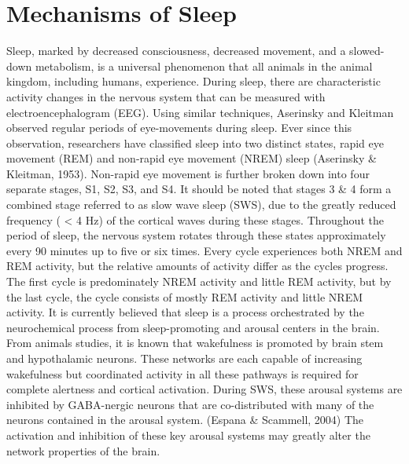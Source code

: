 \documentclass[12pt,letterpaper]{report}
\begin{document}
\section{Mechanisms of Sleep}
	Sleep, marked by decreased consciousness, decreased movement, and a slowed-down metabolism, is a universal phenomenon that all animals in the animal kingdom, including humans, experience. During sleep, there are characteristic activity changes in the nervous system that can be measured with electroencephalogram (EEG). Using similar techniques, Aserinsky and Kleitman observed regular periods of eye-movements during sleep. Ever since this observation, researchers have classified sleep into two distinct states, rapid eye movement (REM) and non-rapid eye movement (NREM) sleep (Aserinsky & Kleitman, 1953). Non-rapid eye movement is further broken down into four separate stages, S1, S2, S3, and S4. It should be noted that stages 3  & 4 form a combined stage referred to as slow wave sleep (SWS), due to the greatly reduced frequency ( < 4 Hz) of the cortical waves during these stages. Throughout the period of sleep, the nervous system rotates through these states approximately every 90 minutes up to five or six times. Every cycle experiences both NREM and REM activity, but the relative amounts of activity differ as the cycles progress. The first cycle is predominately NREM activity and little REM activity, but by the last cycle, the cycle consists of mostly REM activity and little NREM activity.
	It is currently believed that sleep is a process orchestrated by the neurochemical process from sleep-promoting and arousal centers in the brain. From animals studies, it is known that wakefulness is promoted by brain stem and hypothalamic neurons. These networks are each capable of increasing wakefulness but coordinated activity in all these pathways is required for complete alertness and cortical activation. During SWS, these arousal systems are inhibited by GABA-nergic neurons that are co-distributed with many of the neurons contained in the arousal system. (Espana & Scammell, 2004) The activation and inhibition of these key arousal systems may greatly alter the network properties of the brain.
\end{document}

